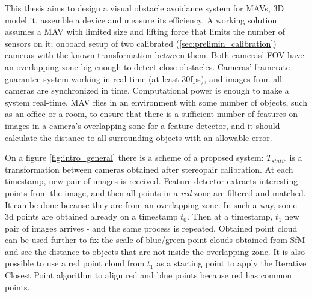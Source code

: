 This thesis aims to design a visual obstacle avoidance system for MAVs, 3D model it, assemble a device and measure its efficiency. 
A working solution assumes a MAV with limited size and lifting force that limits the number of sensors on it; onboard setup of two calibrated (\autoref{sec:prelimin_calibration}) cameras with the known transformation between them.
Both cameras' FOV have an overlapping zone big enough to detect close obstacles.
Cameras' framerate guarantee system working in real-time (at least 30fps), and images from all cameras are synchronized in time.
Computational power is enough to make a system real-time.
MAV flies in an environment with some number of objects, such as an office or a room, to ensure that there is a sufficient number of features on images in a camera's overlapping sone for a feature detector, and it should calculate the distance to all surrounding objects with an allowable error.

On a figure \autoref{fig:intro_general} there is a scheme of a proposed system: $T_{static}$ is a transformation between cameras obtained after stereopair calibration. 
At each timestamp, new pair of images is received.
Feature detector extracts interesting points from the image, and then all points in a \textit{red} zone are filtered and matched.
It can be done because they are from an overlapping zone. 
In such a way, some 3d points are obtained already on a timestamp $t_0$. 
Then at a timestamp, $t_1$ new pair of images arrives - and the same process is repeated. 
Obtained point cloud can be used further to fix the scale of blue/green point clouds obtained from SfM and see the distance to objects that are not inside the overlapping zone.
It is also possible to use a red point cloud from $t_1$ as a starting point to apply the Iterative Closest Point algorithm to align red and blue points because red has common points.
